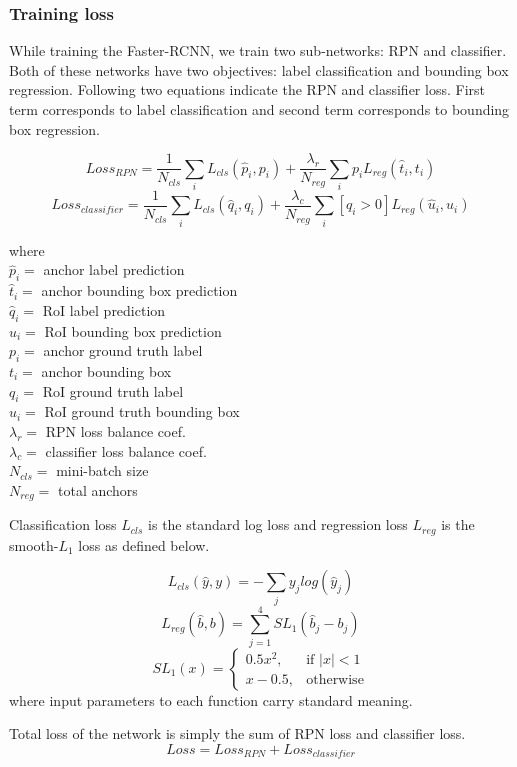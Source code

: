 \subsubsection{Training loss}
While training the Faster-RCNN, we train two sub-networks: RPN and classifier. Both of these networks have two objectives: label classification and bounding box regression. Following two equations indicate the RPN and classifier loss. First term corresponds to label classification and second term corresponds to bounding box regression. 

$$Loss_{RPN}= \frac{1}{N_{cls}}\sum_i L_{cls}(\hat{p}_i,p_i) + \frac{\lambda_r}{N_{reg}}\sum_i p_i L_{reg}(\hat{t}_i,t_i)$$
$$Loss_{classifier} = \frac{1}{N_{cls}}\sum_i L_{cls}(\hat{q}_i,q_i) + \frac{\lambda_c}{N_{reg}}\sum_i [q_i > 0] L_{reg}(\hat{u}_i,u_i)$$

where \\
$\hat{p}_i=$ anchor label prediction \\
$\hat{t}_i=$ anchor bounding box prediction \\
$\hat{q}_i=$ RoI label prediction \\
$\hat{u}_i=$ RoI bounding box prediction \\
${p}_i=$ anchor ground truth label \\
${t}_i=$ anchor bounding box  \\
${q}_i=$ RoI ground truth label  \\
${u}_i=$ RoI ground truth bounding box  \\
$\lambda_r =$ RPN loss balance coef. \\
$\lambda_c =$ classifier loss balance coef. \\
$N_{cls}=$ mini-batch size \\
$N_{reg}=$ total anchors

Classification loss $L_{cls}$ is the standard log loss and regression loss $L_{reg}$ is the smooth-$L_1$ loss as defined below. 

$$ L_{cls}(\hat{y},y) = -\sum_j y_jlog(\hat{y}_j) $$
$$ L_{reg}(\hat{b},b) = \sum_{j=1}^4 SL_1(\hat{b}_j - b_j) $$
$$SL_1(x) = \begin{cases}
0.5x^2, & \text{if } |x|<1 \\
x-0.5,  & \text{otherwise}
\end{cases}
$$
where input parameters to each function carry standard meaning. 

Total loss of the network is simply the sum of RPN loss and classifier loss.
$$ Loss = Loss_{RPN} + Loss_{classifier} $$

